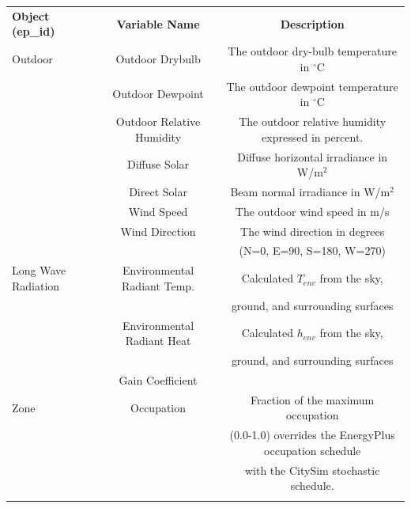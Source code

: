\documentclass{tBPS2e}
\theoremstyle{plain}
\theoremstyle{definition}
\theoremstyle{remark}
\begin{document}
\begin{table}[H]
{\begin{tabular}[l]{@{}lcc}\toprule
  \bf{Object (ep\_id)} &  \bf{Variable Name} & \bf{Description} \\
\colrule
  Outdoor & Outdoor Drybulb & The outdoor dry-bulb temperature in $^{\circ}\mathrm{C}$ \\
 & Outdoor Dewpoint & The outdoor dewpoint temperature in $^{\circ}\mathrm{C}$ \\
 & Outdoor Relative Humidity & The outdoor relative humidity expressed in percent. \\
 & Diffuse Solar & Diffuse horizontal irradiance in W/m$^2$ \\
 & Direct Solar & Beam normal irradiance in W/m$^2$ \\
 & Wind Speed & The outdoor wind speed in m/s \\
 & Wind Direction & The wind direction in degrees\\&&  (N=0, E=90, S=180, W=270) \\
 \hline
 Long Wave Radiation & Environmental Radiant Temp. & Calculated $T_{env}$ from the sky,\\&& ground, and surrounding surfaces \\
 & Environmental Radiant Heat & Calculated $h_{env}$ from the sky,\\&& ground, and surrounding surfaces \\
 & Gain Coefficient \\
 \hline
Zone & Occupation & Fraction of the maximum occupation\\&& (0.0-1.0) overrides the EnergyPlus occupation schedule\\&&  with the CitySim stochastic schedule. \\
\botrule
\end{tabular}}
\label{FMUimports}
\end{table}
\end{document}

